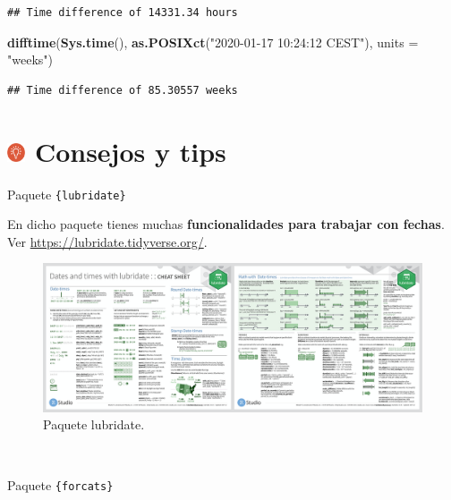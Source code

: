 \documentclass[11pt,]{book}
\newenvironment{Shaded}{\begin{snugshade}}{\end{snugshade}}
\newcommand{\DataTypeTok}[1]{\textcolor[rgb]{0.27,0.27,0.27}{#1}}
\newcommand{\KeywordTok}[1]{\textcolor[rgb]{0.27,0.27,0.27}{\textbf{#1}}}
\newcommand{\NormalTok}[1]{#1}
\newcommand{\StringTok}[1]{\textcolor[rgb]{0.5,0.5,0.5}{#1}}
\begin{document}
\begin{verbatim}
## Time difference of 14331.34 hours
\end{verbatim}

\begin{Shaded}
\begin{Highlighting}[]
\KeywordTok{difftime}\NormalTok{(}\KeywordTok{Sys.time}\NormalTok{(), }\KeywordTok{as.POSIXct}\NormalTok{(}\StringTok{"2020-01-17 10:24:12 CEST"}\NormalTok{), }\DataTypeTok{units =} \StringTok{"weeks"}\NormalTok{)}
\end{Highlighting}
\end{Shaded}

\begin{verbatim}
## Time difference of 85.30557 weeks
\end{verbatim}

\hypertarget{consejos-y-tips-7}{%
\section[ Consejos y tips]{\texorpdfstring{\protect\includegraphics[width=0.04\textwidth,height=\textheight]{img/logo_info.png} Consejos y tips}{ Consejos y tips}}\label{consejos-y-tips-7}}

Paquete \texttt{\{lubridate\}}

En dicho paquete tienes muchas \textbf{funcionalidades para trabajar con fechas}. Ver \url{https://lubridate.tidyverse.org/}.

\begin{figure}

{\centering \includegraphics[width=0.95\linewidth]{./img/lubridate} 

}

\caption{Paquete lubridate.}\label{fig:lubridate}
\end{figure}

~

Paquete \texttt{\{forcats\}}
\end{document}
